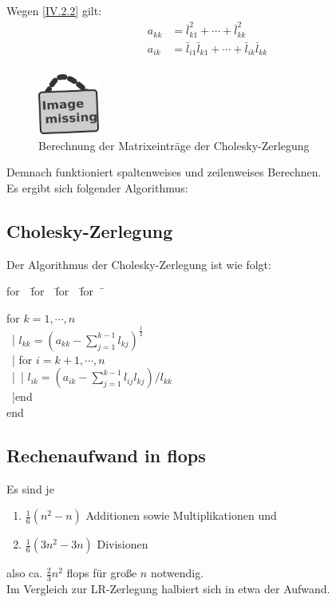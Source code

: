 \documentclass[ngerman,fontsize=11pt, paper=a4, parskip=half, titlepage=true, toc=bib]{scrbook}
\newenvironment{pseudocode}[1]{ %
		\begin{minipage}{#1}
			\begin{framed}
				\hspace*{1em}	
				\begin{minipage}{#1}
					\begin{tabbing}
						for~~\= for~~\= for~~\= for~~\= \kill
	}
	{ %
					\end{tabbing}
				\end{minipage}
				\hspace*{1em}
			\end{framed}
		\end{minipage}
	}
\newcommand{\imagemissing}[1]{
	\begin{figure}
		\centering
		\includegraphics[width=2cm]{images/image_missing.jpg}
		\caption{#1}
	\end{figure}
}
\begin{document}
		Wegen \eqref{IV.2.2} gilt: 
		\begin{align}
			a_{kk} &= \bar{l}_{k1}^{2} + \cdots +  \bar{l}_{kk}^2  \label{IV.2.3} \\
			a_{ik} &= \bar{l}_{i1} \bar{l}_{k1} + \cdots + \bar{l}_{ik} \bar{l}_{kk}  \label{IV.2.4} \\
		\end{align}
		\imagemissing{Berechnung der Matrixeinträge der Cholesky-Zerlegung}
		Demnach funktioniert spaltenweises und zeilenweises Berechnen. \\
		
		Es ergibt sich folgender Algorithmus:
		
		
		\subsection{Cholesky-Zerlegung}
			Der Algorithmus der Cholesky-Zerlegung ist wie folgt:
			
				\begin{pseudocode}{0.55\linewidth}
						for  $k=1, \cdots , n$\\
									~|\> $l_{kk} = (a_{kk}-\sum_{j=1}^{k-1}l_{kj})^{\frac{1}{2}}$ \\
									~|\> for $i= k+1, \cdots , n$ \\
									~|\>~|\> $l_{ik} = ( a_{ik}- \sum_{j=1}^{k-1}l_{ij} l_{kj})/{l_{kk}}$  \\
									~|\>end\\
						end
					\end{pseudocode}
			
			
			
	\subsection{Rechenaufwand in flops}
	Es sind je 
		\begin{enumerate}
			\item[] $\frac{1}{6}(n^2-n) $ Additionen sowie Multiplikationen und 
			\item[]  $\frac{1}{6}(3n^2-3n) $ Divisionen 
		\end{enumerate}
		also ca. $\frac{2}{3} n^2$ flops für große $n$ notwendig. \\
		Im Vergleich zur LR-Zerlegung halbiert sich in etwa der Aufwand.
		
\end{document}
